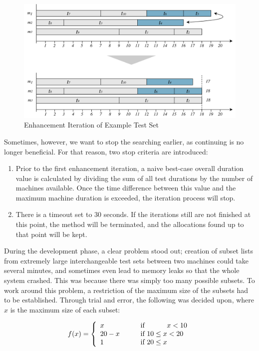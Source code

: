 \begin{figure}[t]
    \centering
    \includegraphics[width=\textwidth]{figures/new/iteration3.pdf}
    \caption{Enhancement Iteration of Example Test Set}
    \label{fig.iteration}
\end{figure}

Sometimes, however, we want to stop the searching earlier, as continuing is no longer beneficial. For that reason, two stop criteria are introduced:

\begin{enumerate}
    \item Prior to the first enhancement iteration, a naive best-case overall duration value is calculated by dividing the sum of all test durations by the number of machines available. Once the time difference between this value and the maximum machine duration is exceeded, the iteration process will stop.
    \item There is a timeout set to 30 seconds. If the iterations still are not finished at this point, the method will be terminated, and the allocations found up to that point will be kept.
\end{enumerate}

During the development phase, a clear problem stood out; creation of subset lists from extremely large interchangeable test sets between two machines could take several minutes, and sometimes even lead to memory leaks so that the whole system crashed. This was because there was simply too many possible subsets. To work around this problem, a restriction of the maximum size of the subsets had to be established. Through trial and error, the following was decided upon, where $x$ is the maximum size of each subset:

\[
\hfill
    f(x)=\left\{
        \begin{array}{l l}
          x         &   \hspace{20px} \text{if} \hspace{32px} x < 10\\
          20-x      &   \hspace{20px} \text{if} \ 10 \leq x < 20 \\
          1         &   \hspace{20px} \text{if} \ 20 \leq x
        \end{array}
    \right.
\hfill
\]

